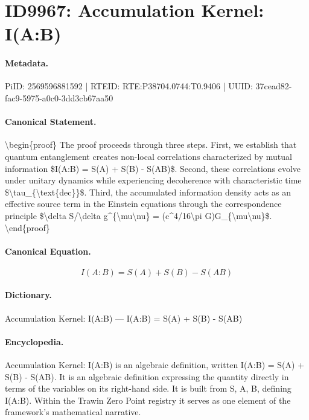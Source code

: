 \section*{ID9967: Accumulation Kernel: I(A:B)}
\paragraph{Metadata.}
PiID: 2569596881592 | RTEID: RTE:P38704.0744:T0.9406 | UUID: 37cead82-fac9-5975-a0c0-3dd3cb67aa50

\paragraph{Canonical Statement.}
\textbackslash{}begin\{proof\} The proof proceeds through three steps. First, we establish that quantum entanglement creates non-local correlations characterized by mutual information \$I(A:B) = S(A) + S(B) - S(AB)\$. Second, these correlations evolve under unitary dynamics while experiencing decoherence with characteristic time \$\textbackslash{}tau\_\{\textbackslash{}text\{dec\}\}\$. Third, the accumulated information density acts as an effective source term in the Einstein equations through the correspondence principle \$\textbackslash{}delta S/\textbackslash{}delta g\textasciicircum{}\{\textbackslash{}mu\textbackslash{}nu\} = (c\textasciicircum{}4/16\textbackslash{}pi G)G\_\{\textbackslash{}mu\textbackslash{}nu\}\$. \textbackslash{}end\{proof\}

\paragraph{Canonical Equation.}
\[
I(A:B) = S(A) + S(B) - S(AB)
\]

\paragraph{Dictionary.}
Accumulation Kernel: I(A:B) — I(A:B) = S(A) + S(B) - S(AB)

\paragraph{Encyclopedia.}
Accumulation Kernel: I(A:B) is an algebraic definition, written I(A:B) = S(A) + S(B) - S(AB). It is an algebraic definition expressing the quantity directly in terms of the variables on its right-hand side. It is built from S, A, B, defining I(A:B). Within the Trawin Zero Point registry it serves as one element of the framework's mathematical narrative.

